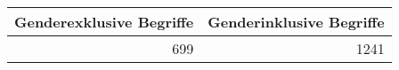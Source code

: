 
\begin{tabular}{rr}
\toprule
Genderexklusive Begriffe & Genderinklusive Begriffe\\
\midrule
699 & 1241\\
\bottomrule
\end{tabular}